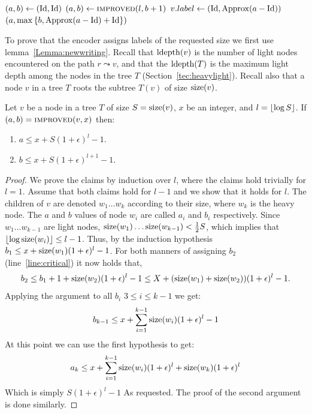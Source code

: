 \begin{algorithmic}[1] 
        \State $(a,b) \gets (\operatorname{Id},\operatorname{Id})$	
	\State $(a,b) \gets  \Call{improved}{l,b+1}$ 
	\EndFor
	\State $v.label \gets (\operatorname{Id},\operatorname{Approx}(a-\operatorname{Id}))$ 
	\State \Return $(a,\max{ \{b,\operatorname{Approx}(a-\operatorname{Id})+\operatorname{Id}\}})$  \label{line:critical}
\EndFunction
\end{algorithmic}
   To prove that the encoder assigns labels of the requested size we first use  lemma~\ref{Lemma:newwriting}.
Recall  that $\operatorname{ldepth}(v)$ is the number of light nodes encountered on the path $r \leadsto v$, and that  the  $\operatorname{ldepth}(T)$ is the maximum light depth among the nodes in the tree $T$ (Section~\ref{tec:heavylight}). 
Recall also  that a node $v$ in a  tree $T$ roots the subtree $T(v)$ of size $\operatorname{size}(v)$.
\begin{lemma}\label{Lemma:newwriting}
Let $v$ be  a node in a tree $T$  of size $S = \operatorname{size}(v)$,   $x$ be an integer, and $l = \left\lfloor{\log S}\right\rfloor$.
If $(a,b)=\textsc{improved}(v,x)$ then:
\begin{enumerate}
	\item $a \leq x + S(1+\epsilon)^l -1.$
	\item $b \leq x + S(1+\epsilon)^{l+1}-1.$
\end{enumerate}
\end{lemma}
\begin{proof}
		We prove the claims by induction over $l$, where the claims hold trivially for $l =1$.
		Assume that both claims hold for $l-1$  and we show that it holds for $l$.
		The children of $v$ are denoted $w_1 \dots w_k$ according to their size, where $w_k$ is the heavy node.
		The $a$ and $b$ values of  node $w_i$ are called $a_i$ and $b_i$ respectively.
		Since $w_1 \dots w_{k-1}$ are light nodes, $\operatorname{size}(w_1) \dots \operatorname{size}(w_{k-1}) < \frac{1}{2}S$, which implies that  $\left\lfloor{\log \operatorname{size}(w_i)}\right\rfloor \leq l-1$.
		Thus, by the induction hypothesis  $b_1 \leq  x + \operatorname{size}(w_1)(1+\epsilon)^{l}-1$. 
		For both manners of  assigning $b_2$ (line~\ref{line:critical}) it now holds that,  
		$$b_2 \leq  b_1+1 + \operatorname{size}(w_2)(1+\epsilon)^{l}-1 \leq  X + (\operatorname{size}(w_1)+\operatorname{size}(w_2)) (1+\epsilon)^{l}-1.$$
		Applying the argument to all $b_i$ $3 \leq i \leq k-1$ we get:
		 $$b_{k-1} \leq   x +  \sum_{i=1}^{k-1}\operatorname{size}(w_i) (1+\epsilon)^{l}-1$$
	At this point  we can use the first hypothesis to get:
	$$a_{k} \leq  x +  \sum_{i=1}^{k-1}\operatorname{size}(w_i) (1+\epsilon)^{l} + \operatorname{size}(w_k)(1+\epsilon)^l$$
	Which is simply $S(1+\epsilon)^l-1$ As requested. The proof of the second argument is done similarly.
	\end{proof}
 

